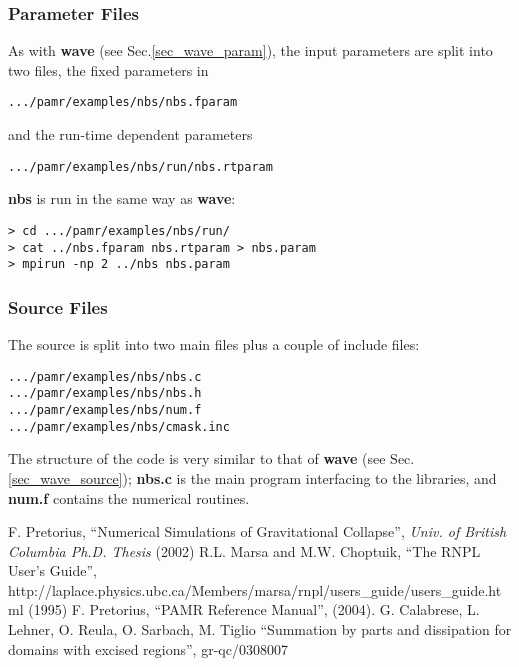 \documentclass[aps,amssymb,unsortedaddress,nofootinbib]{revtex4}
\begin{document}
\subsubsection{Parameter Files}
As with {\bf wave} (see Sec.\ref{sec_wave_param}), 
the input parameters are split into two files, the fixed parameters
in 
\begin{verbatim}
.../pamr/examples/nbs/nbs.fparam
\end{verbatim}
and the run-time dependent parameters
\begin{verbatim}
.../pamr/examples/nbs/run/nbs.rtparam
\end{verbatim}
{\bf nbs} is run in the same way as {\bf wave}:
\begin{verbatim}
> cd .../pamr/examples/nbs/run/
> cat ../nbs.fparam nbs.rtparam > nbs.param
> mpirun -np 2 ../nbs nbs.param
\end{verbatim}

\subsubsection{Source Files}
The source is split into two main files plus a couple of include files:
\begin{verbatim}
.../pamr/examples/nbs/nbs.c
.../pamr/examples/nbs/nbs.h
.../pamr/examples/nbs/num.f
.../pamr/examples/nbs/cmask.inc
\end{verbatim}
The structure of the code is very similar to that of {\bf wave} (see Sec.\ref{sec_wave_source});
{\bf nbs.c} is the main program interfacing to the libraries,
and {\bf num.f} contains the numerical routines.

\begin{thebibliography}{1}
 F. Pretorius,
 ``Numerical Simulations of Gravitational Collapse'',
 {\em Univ. of British Columbia Ph.D. Thesis} (2002)
 R.L. Marsa and M.W. Choptuik,
 ``The RNPL User's Guide'',\\
 {http://laplace.physics.ubc.ca/Members/marsa/rnpl/users\_guide/users\_guide.html}
 (1995)
 F. Pretorius,
 ``PAMR Reference Manual'', (2004).
 G. Calabrese, L. Lehner, O. Reula, O. Sarbach, M. Tiglio
   ``Summation by parts and dissipation for domains with excised regions'',
      gr-qc/0308007
\end{thebibliography}
\end{document}
